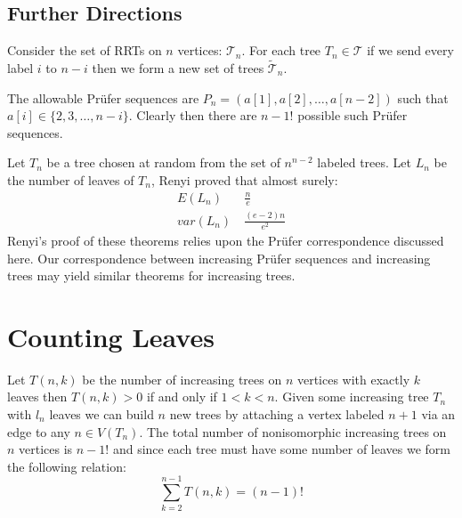 \documentclass[10pt]{article} %
\theoremstyle{definition}
\DeclareMathOperator{\Pos}{Pos}
\begin{document}



\subsection{Further Directions}\label{sec:fd}
Consider the set of  RRTs on  $n$ vertices: $\mathcal{T}_{n}$.  For each tree $T_{n} \in \mathcal{T}$ if we send every label $i$ to $n - i$ then we form a new set of trees $\tilde{\mathcal{T}}_{n}$.  

The allowable Pr\"{u}fer sequences are $P_{n} = (a[1],a[2],\dots,a[n-2])$ such that $a[i] \in \{2,3,\dots,n-i\}$.  Clearly then there are $n-1!$ possible such Pr\"{u}fer sequences.   

Let $T_{n}$ be a tree chosen at random from the set of $n^{n-2}$ labeled trees.  Let $L_{n}$ be the number of leaves of $T_{n}$, Renyi \cite{Renyi} proved that almost surely:
\begin{align}
 E(L_{n}) & ~ \frac{n}{e} \\
 var(L_{n}) & ~ \frac{(e - 2)n}{e^{2}}
\end{align}
Renyi's proof of these theorems relies upon the Pr\"{u}fer correspondence discussed here.  Our correspondence between increasing Pr\"{u}fer sequences and increasing trees may yield similar theorems for increasing trees.  

\section{Counting Leaves}
Let $T(n,k)$ be the number of increasing trees on $n$ vertices with exactly $k$ leaves then $T(n,k) >0$ if and only if $1 < k < n$. Given some increasing tree $T_{n}$ with $l_{n}$ leaves we can build $n$ new trees by attaching a vertex labeled $n+1$ via an edge to any $n \in V(T_{n})$. The total number of nonisomorphic increasing trees on $n$ vertices is $n-1!$ and since each tree must have some number of leaves we form the following relation:
\begin{equation}\label{eq:i}
 \sum_{k=2}^{n-1}T(n,k) = (n-1)!
\end{equation}
\end{document}

